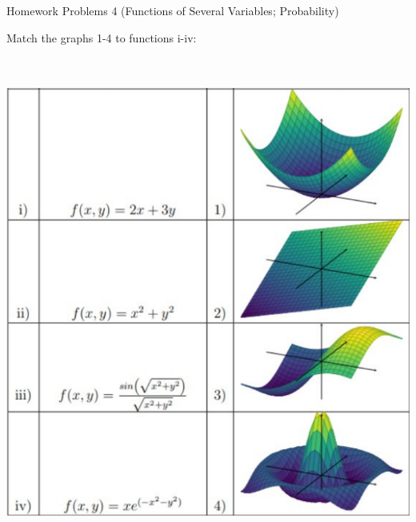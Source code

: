  \begin{center}\begin{large} Homework Problems 4 (Functions of Several Variables; Probability) \end{large}\end{center}
 \bigskip






\begin{problem}%
Match the graphs 1-4 to functions i-iv: 
\begin{center}
\\~\\
\includegraphics[width=0.6\linewidth]{figs/f(x,y) functions.png}
\\~\\
\end{center}
\end{problem}

\medskip








